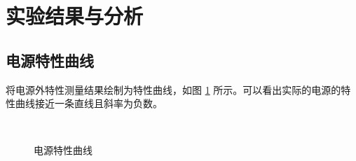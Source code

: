 \documentclass[a4paper,utf8]{article}
\begin{document}
\section{实验结果与分析}
\subsection{电源特性曲线}
将电源外特性测量结果绘制为特性曲线，如图 \ref{fig:curve} 所示。可以看出实际的电源的特性曲线接近一条直线且斜率为负数。
\begin{figure}[!ht]
    \caption{电源特性曲线}\label{fig:curve}
    \\
\end{figure}
\end{document}
